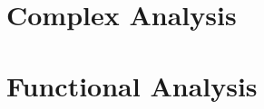\documentclass[a4paper,pdftex,10pt]{report}
\begin{document}
\maketitle

\tableofcontents

\clearpage
\chapter{Complex Analysis}



















\clearpage
\chapter{Functional Analysis}
































\clearpage



\nocite{Ahlfors:2013}

\end{document}
